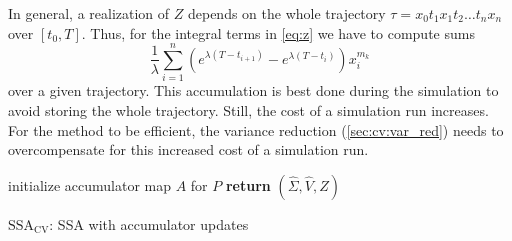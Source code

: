 In general, a realization of $Z$ depends on the whole trajectory
$\tau=x_0t_1 x_1 t_2 \dots\allowbreak t_n x_n$ over $[t_0,T]$.
Thus, for the integral terms
in \eqref{eq:z} we have to compute sums
\begin{equation}\label{eq:dis_int}
  \frac{1}{\lambda}\sum_{i=1}^n\left(e^{\lambda(T - t_{i+1})}
  - e^{\lambda(T-t_i)}\right)x_i^{m_k}
\end{equation}
over a given trajectory.
This accumulation is best done during the simulation to avoid storing
the whole trajectory.
Still, the cost of a simulation run increases.
For the method to be efficient, the variance reduction
(\autoref{sec:cv:var_red}) needs
to overcompensate for this increased cost of a simulation run.
\begin{algorithm}
  initialize accumulator map $A$ for $P$\;
  \textbf{return} $(\hat{\Sigma},\hat{V}, \hat{Z})$\;
  \caption{\label{alg:ssa_lcv}$\text{SSA}_{\text{CV}}$: \ac{SSA} with
  accumulator updates}
\end{algorithm}


